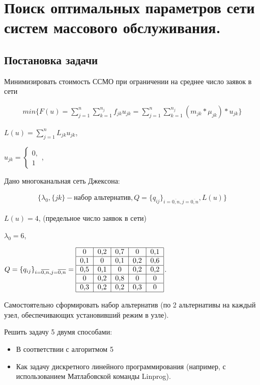 \documentclass[a4paper, 12pt]{article}		%
\begin{document}
\newpage
\section{Поиск оптимальных параметров сети систем массового обслуживания.}

\subsection{Постановка задачи}
Минимизировать стоимость ССМО при ограничении на среднее число заявок в сети

\begin{gather*}
min\{F(u) = \sum\limits_{j=1}^n \sum\limits_{k=1}^{n_j} f_{jk} u_{jk} = \sum\limits_{j=1}^n \sum\limits_{k=1}^{n_j} (m_{jk} * \mu_{jk}) * u_{jk} \}
\end{gather*} 

$ L(u) = \sum\limits_{j=1}^n L_{jk} u_{jk}$,

$ u_{jk} =
  \begin{cases}
    0,\\
    1
 \end{cases}$,
 
Дано многоканальная сеть Джексона:

\begin{gather*}
\{ \lambda_0, \{jk\} - \text{набор альтернатив}, Q=\{q_{ij}\}_{i=\overline{0,n}, j=\overline{0,n}}, L(u) \}
\end{gather*} 

$L(u) = 4$, (предельное число заявок в сети)

$\lambda_0 = 6$,

$Q=\{q_{ij}\}_{i=\overline{0,n}, j=\overline{0,n}} = \begin{tabular}{|c|c|c|c|c|}
\hline 
0 & 0,2 & 0,7 & 0 & 0,1 \\ 
\hline 
0,1 & 0 & 0,1 & 0,2 & 0,6 \\ 
\hline 
0,5 & 0,1 & 0 & 0,2 & 0,2 \\ 
\hline 
0 & 0,2 & 0,8 & 0 & 0 \\ 
\hline 
0,3 & 0,2 & 0,2 & 0,3 & 0 \\ 
\hline 
\end{tabular} $.

Самостоятельно сформировать набор альтернатив (по 2 альтернативы на каждый узел, обеспечивающих установивший режим в узле).

Решить задачу 5 двумя способами:

\begin{itemize}
\item В соответствии с алгоритмом 5
\item Как задачу дискретного линейного программирования (например, с использованием Матлабовской команды Linprog).
\end{itemize}
\end{document}
